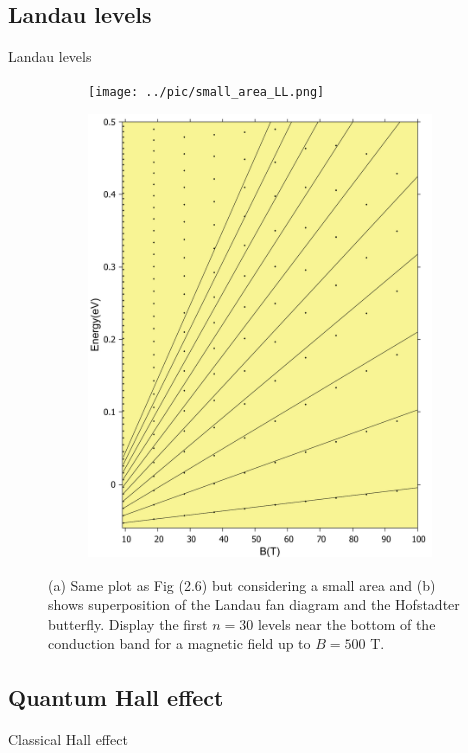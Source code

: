 \documentclass[aspectratio=169,compress,x11names]{beamer}
\begin{document}
	\subsection{Landau levels}
	\begin{frame}{Landau levels}
		\begin{figure}
			\centering
			\begin{subfigure}[b]{0.49\textwidth}
				\centering
				{\texttt{[image: ../pic/small\_area\_LL.png]}}
			\end{subfigure}
			\begin{subfigure}[b]{0.49\textwidth}
				\centering
				\includegraphics[width=0.6\linewidth]{../pic/landaulevel_h0_q_797.pdf}
			\end{subfigure}
			\caption{
				(a) Same plot as Fig (2.6) but considering a small area and (b) shows superposition of the Landau fan diagram and the Hofstadter butterfly. Display the first $n = 30$ levels near the bottom of the conduction band for a magnetic field up to $B = 500$ T.
			}
		\end{figure}
	\end{frame}
	\subsection{Quantum Hall effect}
	\begin{frame}{Classical Hall effect}
	\end{frame}
\end{document}
